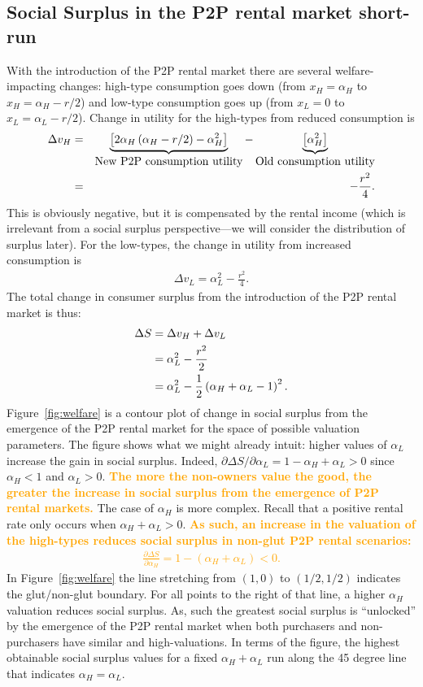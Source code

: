 \documentclass[11pt]{article}
\newcommand{\important}[1]{\textcolor{orange}{\textbf{#1}}}
\newcommand{\important}[1]{#1}
\begin{document}
\subsection{Social Surplus in the P2P rental market short-run} 
With the introduction of the P2P rental market there are several welfare-impacting changes: 
high-type consumption goes down (from $x_H = \alpha_H$ to  $x_H = \alpha_H - r/2$) and low-type consumption goes up (from $x_L = 0$ to $x_L = \alpha_L - r/2$). 
Change in utility for the high-types from reduced consumption is 
\begin{eqnarray}
\Delta v_H &=& \underbrace{\left[2 \alpha_H \left(\alpha_H - r/2\right) - \alpha_H^2 \right]}_{\mbox{New P2P consumption utility}} - 
                             \underbrace{\left[\alpha_H^2 \right]}_{\mbox{Old consumption utility}}   \notag \\
           &=& - \frac{r^2}{4}. 
\end{eqnarray} 
This is obviously negative, but it is compensated by the rental income (which is irrelevant from a social surplus perspective---we will consider the distribution of surplus later). 
For the low-types, the change in utility from increased consumption is
\begin{align}
\Delta v_L = \alpha_L^2 - \frac{r^2}{4}. 
\end{align} 
The total change in consumer surplus from the introduction of the P2P rental market is thus: 
\begin{align}
\Delta S &= \Delta v_H + \Delta v_L \notag \\ 
         &=  \alpha_L^2 - \frac{r^2}{2} \notag \\
         &= \alpha_L^2 - \frac{1}{2} \left( \alpha_H + \alpha_L -1 \right)^2.
\end{align} 
Figure~\ref{fig:welfare} is a contour plot of change in social surplus from the emergence of the P2P rental market for the space of possible valuation parameters.
The figure shows what we might already intuit: higher values of $\alpha_L$ increase the gain in social surplus.
Indeed, $\partial \Delta S/\partial \alpha_L = 1 - \alpha_H + \alpha_L > 0$ since $\alpha_H < 1$ and $\alpha_L > 0$. 
\important{The more the non-owners value the good, the greater the increase in social surplus from the emergence of P2P rental markets.} 
The case of $\alpha_H$ is more complex. 
Recall that a positive rental rate only occurs when $\alpha_H + \alpha_L > 0$.
\important{As such, an increase in the valuation of the high-types reduces social surplus in non-glut P2P rental scenarios:   
\begin{align} 
\frac{\partial \Delta S}{\partial \alpha_H} =  1 - (\alpha_H + \alpha_L) < 0.
\end{align}} 
In Figure~\ref{fig:welfare} the line stretching from $(1,0)$ to $(1/2, 1/2)$ indicates the glut/non-glut boundary. 
For all points to the right of that line, a higher $\alpha_H$ valuation reduces social surplus.  
As, such the greatest social surplus is ``unlocked'' by the emergence of the P2P rental market when both purchasers and non-purchasers have similar and high-valuations. 
In terms of the figure, the highest obtainable social surplus values for a fixed $\alpha_H + \alpha_L$ run along the 45 degree line that indicates $\alpha_H = \alpha_L$. 
\end{document}
